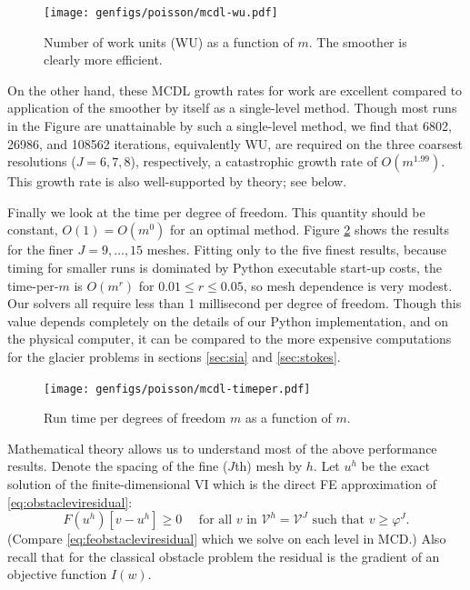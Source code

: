 \documentclass[letterpaper,final,12pt,reqno]{amsart}
\theoremstyle{claim}
\numberwithin{equation}{section}
\numberwithin{figure}{section}
\numberwithin{table}{section}
\numberwithin{theorem}{section}
\begin{document}
\begin{figure}
\texttt{[image: genfigs/poisson/mcdl-wu.pdf]}
\caption{Number of work units (WU) as a function of $m$.  The  smoother is clearly more efficient.}
\label{fig:mcdl-wu}
\end{figure}

On the other hand, these MCDL growth rates for work are excellent compared to application of the smoother by itself as a single-level method.  Though most runs in the Figure are unattainable by such a single-level method, we find that 6802, 26986, and 108562 iterations, equivalently WU, are required on the three coarsest resolutions ($J=6,7,8$), respectively, a catastrophic growth rate of $O(m^{1.99})$.  This growth rate is also well-supported by theory; see below.

Finally we look at the time per degree of freedom.  This quantity should be constant, $O(1)=O(m^0)$ for an optimal method.  Figure \ref{fig:mcdl-timeper} shows the results for the finer $J=9,\dots,15$ meshes.  Fitting only to the five finest results, because timing for smaller runs is dominated by Python executable start-up costs, the time-per-$m$ is $O(m^r)$ for $0.01 \le r \le 0.05$, so mesh dependence is very modest.  Our  solvers all require less than 1 millisecond per degree of freedom.  Though this value depends completely on the details of our Python implementation, and on the physical computer, it can be compared to the more expensive computations for the glacier problems in sections \ref{sec:sia} and \ref{sec:stokes}.

\begin{figure}
\texttt{[image: genfigs/poisson/mcdl-timeper.pdf]}
\caption{Run time per degrees of freedom $m$ as a function of $m$.}
\label{fig:mcdl-timeper}
\end{figure}

Mathematical theory allows us to understand most of the above performance results.   Denote the spacing of the fine ($J$th) mesh by $h$.  Let $u^h$ be the exact solution of the finite-dimensional VI which is the direct FE approximation of \eqref{eq:obstacleviresidual}:
\begin{equation}
  F(u^h)[v-u^h] \ge 0 \quad \text{ for all } v \text{ in $\mathcal{V}^h=\mathcal{V}^J$ such that } v \ge \varphi^J. \label{eq:feobstaclevioriginal}
\end{equation}
(Compare \eqref{eq:feobstacleviresidual} which we solve on each level in MCD.)  Also recall that for the classical obstacle problem the residual is the gradient of an objective function $I(w)$.
\end{document}
